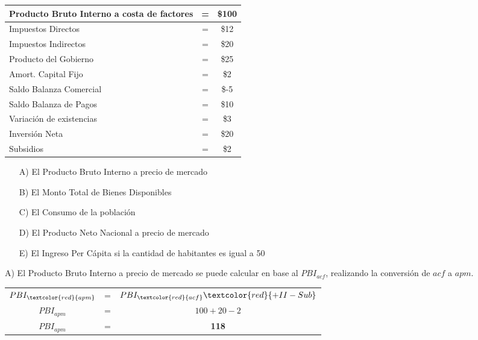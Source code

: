 \documentclass[12pt,a4paper]{article}
\begin{document}
        \begin{table}[H]
        \centering
        	\begin{tabular}{ | l c c | }
            \hline
            Producto Bruto Interno a costa de factores		& =	& \$100 \\ \hline
            Impuestos Directos								& =	& \$12 \\ \hline
            Impuestos Indirectos							& =	& \$20 \\ \hline
            Producto del Gobierno							& =	& \$25 \\ \hline
            Amort. Capital Fijo								& =	& \$2 \\ \hline
            Saldo Balanza Comercial							& =	& \$-5 \\ \hline
            Saldo Balanza de Pagos							& =	& \$10 \\ \hline
            Variación de existencias						& =	& \$3 \\ \hline
            Inversión Neta									& =	& \$20 \\ \hline
            Subsidios										& =	& \$2 \\ \hline
			\end{tabular}
		\end{table}
        
        \begin{itemize}
			\item[A)]	El Producto Bruto Interno a precio de mercado
            \item[B)]	El Monto Total de Bienes Disponibles
            \item[C)]	El Consumo de la población
			\item[D)]	El Producto Neto Nacional a precio de mercado
            \item[E)]	El Ingreso Per Cápita si la cantidad de habitantes es igual a 50
		\end{itemize}
        
        A) El Producto Bruto Interno a precio de mercado se puede calcular en base al $PBI_{acf}$, realizando la conversión de $acf$ a $apm$.
        
		\begin{table}[H]
		\centering
        	\begin{tabular}{ c c c }
               	$ PBI_{\textcolor{red}{apm}} $ &=& $ PBI_{\textcolor{red}{acf}} \textcolor{red}{+ II - Sub} $ \\
                $ PBI_{apm} $ &=& $ 100 + 20 - 2 $ \\
                $ PBI_{apm} $ &=& \textbf{118}
			\end{tabular}
		\end{table}
        
\end{document}
